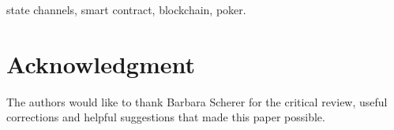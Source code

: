 \documentclass[conference]{IEEEtran}
\begin{document}




\maketitle


\begin{abstract}

\end{abstract}

\begin{IEEEkeywords}
state channels, smart contract, blockchain, poker.
\end{IEEEkeywords}






%
\IEEEpeerreviewmaketitle







\section*{Acknowledgment}		
	
The authors would like to thank Barbara Scherer for the critical review, useful corrections
and helpful suggestions that made this paper possible.


\ifCLASSOPTIONcaptionsoff
  \newpage
\fi
\end{document}
